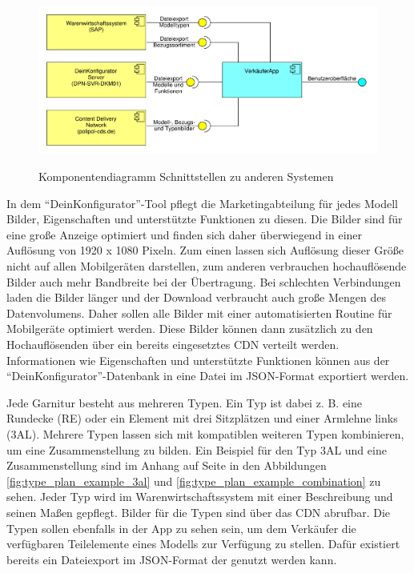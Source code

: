 \begin{figure}[!htb]
    \centering
    \begin{minipage}[t]{.8\textwidth}
        \caption{Komponentendiagramm Schnittstellen zu anderen Systemen}
        \includegraphics[width=1\textwidth]{img/Komponenten_Schnittstellen.pdf}\\
        \label{fig:component_diagram_interfaces}
    \end{minipage}
\end{figure}

In dem \enquote{DeinKonfigurator}-Tool pflegt die Marketingabteilung für jedes Modell Bilder, Eigenschaften und unterstützte Funktionen zu diesen. Die Bilder sind für eine große Anzeige optimiert und finden sich daher überwiegend in einer Auflösung von 1920 x 1080 Pixeln. Zum einen lassen sich Auflösung dieser Größe nicht auf allen Mobilgeräten darstellen, zum anderen verbrauchen hochauflösende Bilder auch mehr Bandbreite bei der Übertragung. Bei schlechten Verbindungen laden die Bilder länger und der Download verbraucht auch große Mengen des Datenvolumens. Daher sollen alle Bilder mit einer automatisierten Routine für Mobilgeräte optimiert werden. Diese Bilder können dann zusätzlich zu den Hochauflösenden über ein bereits eingesetztes \gls{CDN} verteilt werden. Informationen wie Eigenschaften und unterstützte Funktionen können aus der \enquote{DeinKonfigurator}-Datenbank in eine Datei im \gls{JSON}-Format exportiert werden.

Jede Garnitur besteht aus mehreren Typen. Ein Typ ist dabei z. B. eine Rundecke (RE) oder ein Element mit drei Sitzplätzen und einer Armlehne links (3AL). Mehrere Typen lassen sich mit kompatiblen weiteren Typen kombinieren, um eine Zusammenstellung zu bilden. Ein Beispiel für den Typ 3AL und eine Zusammenstellung sind im Anhang auf Seite \pageref{fig:type_plan_example_3al} in den Abbildungen \ref{fig:type_plan_example_3al} und \ref{fig:type_plan_example_combination} zu sehen. Jeder Typ wird im Warenwirtschaftssystem mit einer Beschreibung und seinen Maßen gepflegt. Bilder für die Typen sind über das \gls{CDN} abrufbar. Die Typen sollen ebenfalls in der App zu sehen sein, um dem Verkäufer die verfügbaren Teilelemente eines Modells zur Verfügung zu stellen. Dafür existiert bereits ein Dateiexport im \gls{JSON}-Format der genutzt werden kann.

